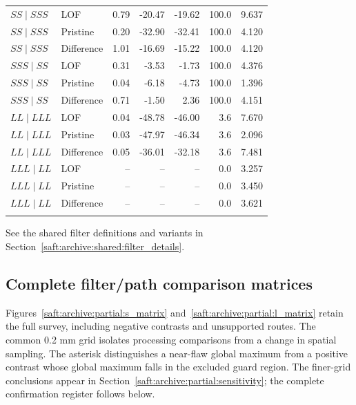 \documentclass[11pt]{article}
\begin{document}
{\begin{longtable}{@{}llrrrrr@{}}
\addlinespace
$SS\mid SSS$ & LOF & 0.79 & -20.47 & -19.62 & 100.0 & 9.637 \\
$SS\mid SSS$ & Pristine & 0.20 & -32.90 & -32.41 & 100.0 & 4.120 \\
$SS\mid SSS$ & Difference & 1.01 & -16.69 & -15.22 & 100.0 & 4.120 \\
\addlinespace
$SSS\mid SS$ & LOF & 0.31 & -3.53 & -1.73 & 100.0 & 4.376 \\
$SSS\mid SS$ & Pristine & 0.04 & -6.18 & -4.73 & 100.0 & 1.396 \\
$SSS\mid SS$ & Difference & 0.71 & -1.50 & 2.36 & 100.0 & 4.151 \\
\addlinespace
$LL\mid LLL$ & LOF & 0.04 & -48.78 & -46.00 & 3.6 & 7.670 \\
$LL\mid LLL$ & Pristine & 0.03 & -47.97 & -46.34 & 3.6 & 2.096 \\
$LL\mid LLL$ & Difference & 0.05 & -36.01 & -32.18 & 3.6 & 7.481 \\
\addlinespace
$LLL\mid LL$ & LOF & -- & -- & -- & 0.0 & 3.257 \\
$LLL\mid LL$ & Pristine & -- & -- & -- & 0.0 & 3.450 \\
$LLL\mid LL$ & Difference & -- & -- & -- & 0.0 & 3.621 \\
\addlinespace
\end{longtable}}

See the shared filter definitions and variants in Section~\ref{saft:archive:shared:filter_details}.
\subsection{Complete filter/path comparison matrices}
Figures~\ref{saft:archive:partial:s_matrix} and~\ref{saft:archive:partial:l_matrix} retain the full survey, including negative contrasts and unsupported routes. The common 0.2 mm grid isolates processing comparisons from a change in spatial sampling. The asterisk distinguishes a near-flaw global maximum from a positive contrast whose global maximum falls in the excluded guard region. The finer-grid conclusions appear in Section~\ref{saft:archive:partial:sensitivity}; the complete confirmation register follows below.
\end{document}

